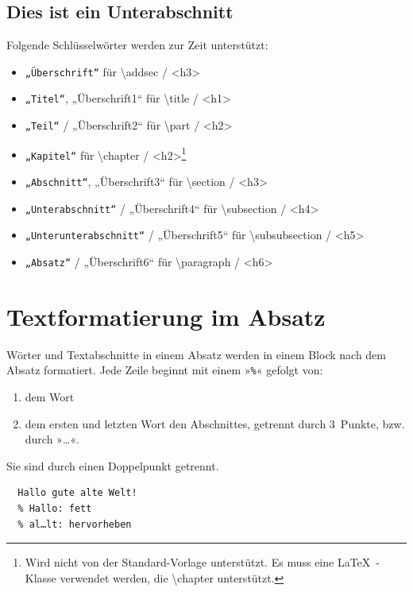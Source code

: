 \documentclass{scrartcl}
\begin{document}
\subsection{Dies ist ein Unterabschnitt}

{Folgende Schlüsselwörter werden zur Zeit unterstützt:\\}

\begin{itemize}
\item \texttt{„Überschrift“} für \textbackslash addsec / <h3>
\item \texttt{„Titel“}, „Überschrift1“  für \textbackslash title / <h1>
\item \texttt{„Teil“} / „Überschrift2“ für \textbackslash part / <h2>
\item \texttt{„Kapitel“} für \textbackslash chapter / <h2>\footnote{Wird nicht von der Standard-Vorlage unterstützt. Es muss eine \LaTeX\ -Klasse verwendet werden, die \textbackslash chapter unterstützt.}\xspace  
\item \texttt{„Abschnitt“}, „Überschrift3“ für \textbackslash section / <h3>
\item \texttt{„Unterabschnitt“} / „Überschrift4“ für \textbackslash subsection / <h4>
\item \texttt{„Unterunterabschnitt“} / „Überschrift5“ für \textbackslash subsubsection / <h5>
\item \texttt{„Absatz“} / „Überschrift6“ für \textbackslash paragraph / <h6>
\end{itemize}


\section{Textformatierung im Absatz}

{Wörter und Textabschnitte in einem Absatz werden in einem
Block nach dem Absatz formatiert. Jede Zeile beginnt mit
einem »\texttt{\%}« gefolgt von:\\}

\begin{enumerate}
\item dem Wort
\item dem ersten und letzten Wort den Abschnittes,
  getrennt durch 3~Punkte, bzw. durch »…«.
\end{enumerate}


{Sie sind durch einen Doppelpunkt getrennt.\\}

\begin{verbatim}
  Hallo gute alte Welt!
  % Hallo: fett
  % al…lt: hervorheben
\end{verbatim}
\end{document}

